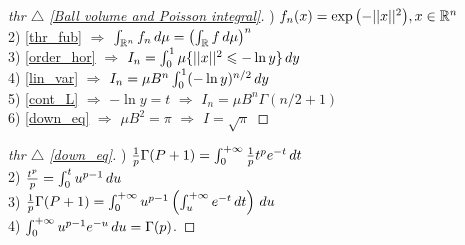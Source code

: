 

\begin{minipage}[t]{0.45\textwidth}

\begin{proof}[
thr \hypertarget{V_ball}{$\triangle$} 
\eqref{Ball volume and Poisson integral}]

\phantom{42}

    ) $f_n(x) = \exp{\left(-||x||^2\right)}, x \in \mathbb{R}^n$ \\
    2) \eqref{thr_fub} $\Rightarrow$ $\int_{\mathbb{R}^n} f_n \, d \mu = \left(\int_{\mathbb{R}} f \, d \mu\right)^n$  \\
    3) \eqref{order_hor} $\Rightarrow$ $I_n = \int_0^1 \mu\{ ||x||^2 \leqslant - \ln y \} \, d y$ \\
    4) \eqref{lin_var} $\Rightarrow$ $I_n = \mu B^n \int_0^1 (-\ln y)^{n/2} \, d y$ \\
    5) \eqref{cont_L} $\Rightarrow$ $-\ln y = t$ $\Rightarrow$ $I_n = \mu B^n \Gamma(n/2+1)$ \\
    6) \eqref{down_eq} $\Rightarrow$ $\mu B^2 = \pi$ $\Rightarrow$ $I = \sqrt{\pi}$
\end{proof}

\end{minipage}
\hfill
\begin{minipage}[t]{0.45\textwidth}
\begin{proof}[
thr \hypertarget{down_eq_link}{$\triangle$} 
\eqref{down_eq}]

\phantom{42}

) $\frac{1}{p} \Gamma(P+1) = \int_0^{+\infty} \frac{1}{p} t^p e^{-t} \, d t$ \\
2) $\frac{t^p}{p} = \int_0^t u^{p-1} \, d u$  \\
3) $\frac{1}{p} \Gamma(P+1) = \int_0^{+\infty} u^{p-1} \left(\int_u^{+\infty} e^{-t} \, d t\right) \, d u$\\
4) $\int_0^{+\infty} u^{p-1} e^{-u} \, d u = \Gamma (p)$.
\end{proof}
\end{minipage}      

\phantom{42}

